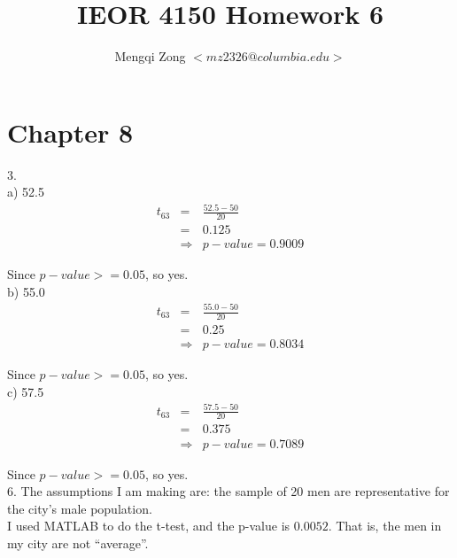 \documentclass[12pt]{article}
\title{IEOR 4150 Homework 6}
\author{Mengqi Zong $<mz2326@columbia.edu>$}
\begin{document}
\maketitle

\setlength{\parindent}{0in}

\section*{Chapter 8}

3. \\
a) 52.5
\begin{eqnarray*}
  t_{63}
  &=& \frac{52.5 - 50}{20} \\
  &=& 0.125 \\
  &\Rightarrow& p-value = 0.9009 
\end{eqnarray*}

Since $p-value >= 0.05$, so yes. \\

b) 55.0
\begin{eqnarray*}
  t_{63}
  &=& \frac{55.0 - 50}{20} \\
  &=& 0.25 \\
  &\Rightarrow& p-value = 0.8034 
\end{eqnarray*}

Since $p-value >= 0.05$, so yes. \\

c) 57.5
\begin{eqnarray*}
  t_{63}
  &=& \frac{57.5 - 50}{20} \\
  &=& 0.375 \\
  &\Rightarrow& p-value = 0.7089
\end{eqnarray*}

Since $p-value >= 0.05$, so yes. \\

6. The assumptions I am making are: the sample of 20 men are representative for the city's male population. \\

I used MATLAB to do the t-test, and the p-value is $0.0052$. That is, the men in my city are not ``average''. \\
\end{document}
